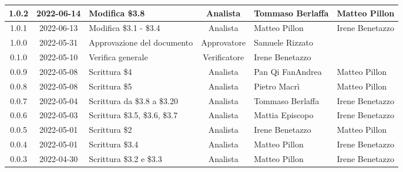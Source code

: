 \begin{center}
\begin{longtable}{ |c|c|p{8em}|c|m{5em}|m{5em}| }
  	\hline
	1.0.2 & 2022-06-14 & Modifica \newline \$3.8 & Analista & Tommaso	\newline Berlaffa & Matteo \newline Pillon\\
  	\hline
	1.0.1 & 2022-06-13 & Modifica \newline \$3.1 - \$3.4 & Analista & Matteo	\newline Pillon & Irene \newline Benetazzo\\
	\hline
	1.0.0 & 2022-05-31 & Approvazione del documento & Approvatore & Samuele \newline Rizzato & \\
	\hline
	0.1.0 & 2022-05-10 & Verifica generale & Verificatore & Irene \newline Benetazzo & \\
	\hline
    0.0.9 & 2022-05-08 & Scrittura \$4 & Analista & Pan Qi Fan\newline Andrea & Matteo \newline Pillon\\
	\hline
    0.0.8 & 2022-05-08 & Scrittura \$5 & Analista & Pietro \newline Macrì & Matteo \newline Pillon\\
	\hline
    0.0.7 & 2022-05-04 & Scrittura \newline da \$3.8 a \$3.20 & Analista & Tommaso \newline Berlaffa & Irene \newline Benetazzo\\
    \hline
    0.0.6 & 2022-05-03 & Scrittura \newline \$3.5, \$3.6, \$3.7 & Analista & Mattia \newline Episcopo & Irene \newline Benetazzo\\
	\hline
    0.0.5 & 2022-05-01 & Scrittura \$2 & Analista & Irene \newline Benetazzo & Matteo \newline Pillon\\
	\hline
    0.0.4 & 2022-05-01 & Scrittura \$3.4 & Analista & Matteo \newline Pillon & Irene \newline Benetazzo\\
	\hline
    0.0.3 & 2022-04-30 & Scrittura \newline \$3.2 e \$3.3 & Analista & Matteo \newline Pillon & Irene \newline Benetazzo\\

\end{longtable}
\end{center}
